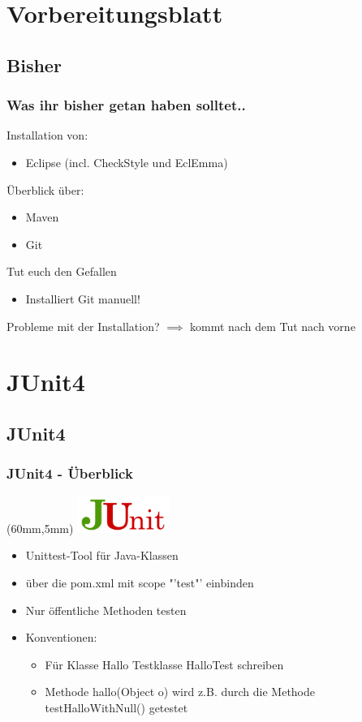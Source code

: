 \documentclass[18pt]{beamer}
\begin{document}
\section{Vorbereitungsblatt}
	\subsection{Bisher}
	\begin{frame}
		\frametitle{Was ihr bisher getan haben solltet..}
		Installation von:
		\begin{itemize}
			\item Eclipse (incl. CheckStyle und EclEmma)
		\end{itemize}
		Überblick über:
		\begin{itemize}
			\item Maven
			\item Git
		\end{itemize}
		\begin{alertblock}{Tut euch den Gefallen}
			\begin{itemize}
				\item Installiert Git manuell!
			\end{itemize}
		\end{alertblock}
		Probleme mit der Installation? $\implies$ kommt nach dem Tut nach vorne
	\end{frame}
		
		
\section{JUnit4}	
	\subsection{JUnit4}
	\begin{frame}
		\frametitle{JUnit4 - Überblick}
		\begin{textblock*}{20mm}(60mm,5mm)
			\includegraphics[width=30mm, scale=0.8]{./pics/tut0/junit-logo.png}
		\end{textblock*}
		\begin{itemize}
			\item Unittest-Tool für Java-Klassen
			\item über die pom.xml mit scope "'test"' einbinden
			\item Nur öffentliche Methoden testen
			\item Konventionen:
			 \begin{itemize}
			 		\item Für Klasse Hallo Testklasse HalloTest schreiben
			 		\item Methode hallo(Object o) wird z.B. durch die Methode testHalloWithNull() getestet
			 \end{itemize}
		\end{itemize}
	\end{frame}	
	
\end{document}
